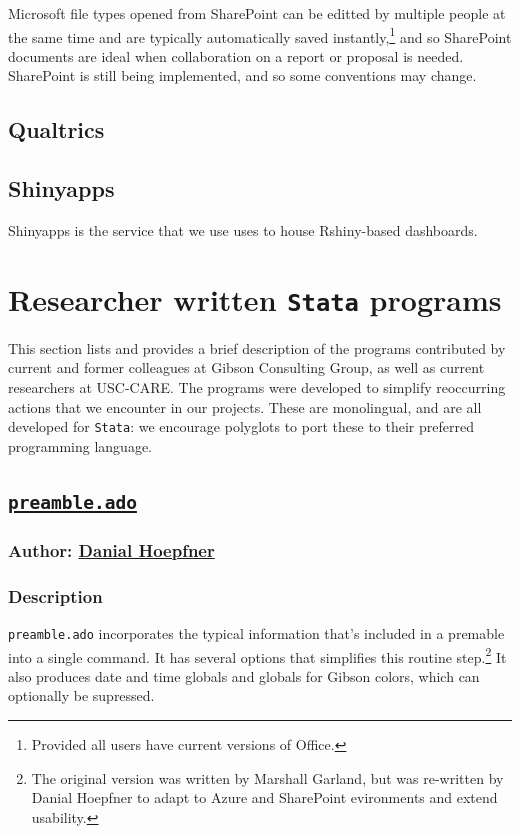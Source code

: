 {Microsoft file types opened from SharePoint can be editted by multiple people at the same time and are typically automatically saved instantly,\footnote{Provided all users have current versions of Office.} and so SharePoint documents are ideal when collaboration on a report or proposal is needed. SharePoint is still being implemented, and so some conventions may change. \\

\subsection{Qualtrics}

\subsection{Shinyapps}
Shinyapps is the service that we use uses to house Rshiny-based dashboards.

\section{Researcher written \texttt{Stata} programs} \label{sec:ados}
This section lists and provides a brief description of the programs contributed by current and former colleagues at Gibson Consulting Group, as well as current researchers at USC-CARE. The programs were developed to simplify reoccurring actions that we encounter in our projects. These are monolingual, and are all developed for \texttt{Stata}: we encourage polyglots to port these to their preferred programming language.
\subsection{\href{https://github.com/GibsonConsult/preamble-ado}{\texttt{preamble.ado}}}
\subsubsection{Author: \href{mailto:dhoepfner@gibsonconsult.com}{Danial Hoepfner}}
\subsubsection{Description}
\texttt{preamble.ado} incorporates the typical information that's included in a premable into a single command. It has several options that simplifies this routine step.\footnote{The original version was written by Marshall Garland, but was re-written by Danial Hoepfner to adapt to Azure and SharePoint evironments and extend usability.} It also produces date and time globals and globals for Gibson colors, which can optionally be supressed.
}
